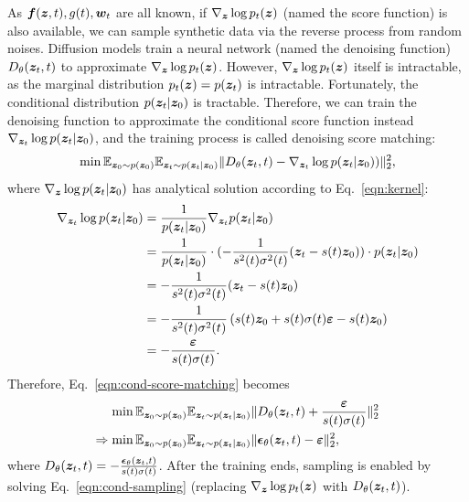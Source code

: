 As ${\bm{f}}({\bm{z}}, t), g(t), {\bm{w}}_t$ are all known, if $\nabla_{{\bm{z}}}\log p_t({\bm{z}})$ (named the score function) is also available, we can sample synthetic data via the reverse process from random noises. Diffusion models train a neural network (named the denoising function) $D_{\theta}({\bm{z}}_t, t)$ to approximate $\nabla_{{\bm{z}}}\log p_t({\bm{z}})$. However,  $\nabla_{{\bm{z}}}\log p_t({\bm{z}})$ itself is intractable, as the marginal distribution $p_t({\bm{z}}) = p({\bm{z}}_t)$ is intractable. Fortunately, the conditional distribution $p({\bm{z}}_t|{\bm{z}}_0)$ is tractable. Therefore, we can train the denoising function to approximate the conditional score function instead $\nabla_{{\bm{z}}_t}\log p({\bm{z}}_t|{\bm{z}}_0)$, and the training process is called denoising score matching:
\begin{equation}\label{eqn:cond-score-matching}
    \min {\mathbb{E}}_{{\bm{z}}_0 \sim p({\bm{z}}_0)} {\mathbb{E}}_{{\bm{z}}_t \sim p({\bm{z}}_t|{\bm{z}}_0)} \Vert D_{\theta}({\bm{z}}_t, t) - \nabla_{{\bm{z}}_t}\log p({\bm{z}}_t|{\bm{z}}_0) )\Vert_2^2, 
\end{equation}
where $\nabla_{{\bm{z}}}\log p({\bm{z}}_t|{\bm{z}}_0)$ has analytical solution according to Eq.~\ref{eqn:kernel}:
\begin{equation}
\begin{split}
    \nabla_{{\bm{z}}_t}\log p({\bm{z}}_t|{\bm{z}}_0)  & = \frac{1}{p({\bm{z}}_t|{\bm{z}}_0)} \nabla_{{\bm{z}}_t} p({\bm{z}}_t|{\bm{z}}_0) \\
    & = \frac{1}{p({\bm{z}}_t|{\bm{z}}_0)} \cdot (- \frac{1}{s^2(t)\sigma^2(t)}({\bm{z}}_t - s(t){\bm{z}}_0))\cdot p({\bm{z}}_t|{\bm{z}}_0) \\
    & = - \frac{1}{s^2(t)\sigma^2(t)}({\bm{z}}_t - s(t){\bm{z}}_0) \\
    & = - \frac{1}{s^2(t)\sigma^2(t)}\left(s(t){\bm{z}}_0 + s(t)\sigma(t)\bm{\varepsilon} - s(t){\bm{z}}_0 \right) \\
    & = - \frac{\bm{\varepsilon}}{s(t)\sigma(t)}.
\end{split}
\end{equation}
Therefore, Eq.~\ref{eqn:cond-score-matching} becomes
\begin{equation}
\begin{split}
        \min {\mathbb{E}}_{{\bm{z}}_0 \sim p({\bm{z}}_0)} & {\mathbb{E}}_{{\bm{z}}_t \sim p({\bm{z}}_t|{\bm{z}}_0)} \Vert D_{\theta}({\bm{z}}_t, t) + \frac{\bm{\varepsilon}}{s(t)\sigma(t)} \Vert_2^2 \\
        \Rightarrow  \min {\mathbb{E}}_{{\bm{z}}_0 \sim p({\bm{z}}_0)} & {\mathbb{E}}_{{\bm{z}}_t \sim p({\bm{z}}_t|{\bm{z}}_0)}  \Vert \bm{\epsilon}_{\theta}({\bm{z}}_t, t) - {\bm{\varepsilon}} \Vert_2^2, \\
\end{split}
\end{equation}
where $D_\theta({\bm{z}}_t, t) = -\frac{\bm{\epsilon}_{\theta}({\bm{z}}_t, t)}{s(t)\sigma(t)}$. After the training ends, sampling is enabled by solving Eq.~\ref{eqn:cond-sampling} (replacing $\nabla_{{\bm{z}}}\log p_t({\bm{z}})$ with $D_\theta({\bm{z}}_t, t)$).

